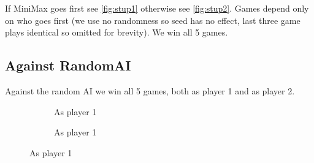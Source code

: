 \documentclass{article}
\newcommand{\rd}{\node [player, fill=red]{};}
\newcommand{\yw}{\node [player, fill=yellow] {};}
\newcommand{\gy}{\node [player, fill=white] {};}
\begin{document}
If MiniMax goes first see \ref{fig:stup1} otherwise see \ref{fig:stup2}. Games depend only on who goes first (we use no randomness so seed has no effect, last three game plays identical so omitted for brevity). We win all 5 games.
	
\newpage
\subsection{Against RandomAI}
Against the random AI we win all 5 games, both as player 1 and as player 2.
\begin{figure}[ht]
	\centering
	\begin{subfigure}[b]{0.4\linewidth}%
		\centering%
		\caption{As player 1}%
		\label{fig:ran2}%
	\end{subfigure}%
	\begin{subfigure}[b]{0.4\linewidth}%
		\centering%
		\caption{As player 1}%
		\label{fig:ran2}%
	\end{subfigure}%
	

\end{figure}
\end{document}

